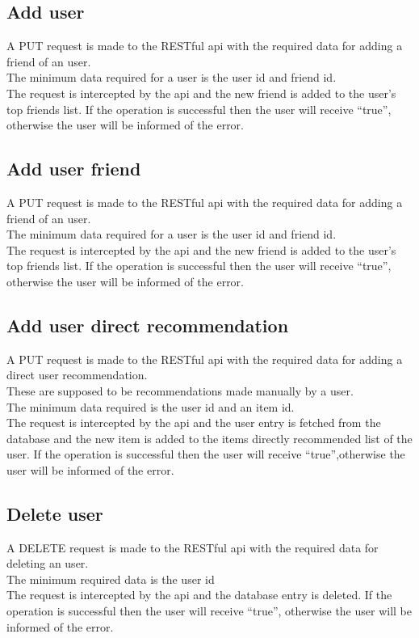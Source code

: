 \subsection{Add user}
\label{sec:workflow-add-user}
A PUT request is made to the RESTful api with the required data for adding a friend of an user.
\\The minimum data required for a user is the user id and friend id.
\\The request is intercepted by the api and the new friend is added to the user’s top friends list. If the operation is successful then the user will receive “true”, otherwise the user will be informed of the error. 

\subsection{Add user friend}
\label{sec:workflow-add-user-friend}
A PUT request is made to the RESTful api with the required data for adding a friend of an user.
\\ The minimum data required for a user is the user id and friend id.
\\ The request is intercepted by the api and the new friend is added to the user’s top friends list. If the operation is successful then the user will receive “true”, otherwise the user will be informed of the error. 

\subsection{Add user direct recommendation}
\label{sec:workflow-add-user-direct-recommendation}
A PUT request is made to the RESTful api with the required data for adding a direct user recommendation.
\\ These are supposed to be recommendations made manually by a user.
\\ The minimum data required is the user id and an item id.
\\ The request is intercepted by the api and the user entry is fetched from the database and the new item is added to the items directly recommended list of the user. If the operation is successful then the user will receive “true”,otherwise the user will be informed of the error. 

\subsection{Delete user}
\label{sec:workflow-delete-user}
A DELETE request is made to the RESTful api with the required data for deleting an user.
\\ The minimum required data is the user id
\\ The request is intercepted by the api and the database entry is deleted. If the operation is successful then the user will receive “true”, otherwise the user will be informed of the error. 


